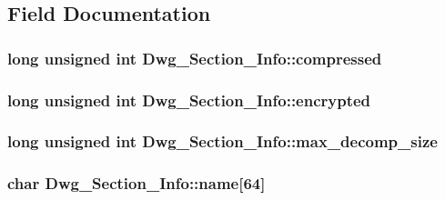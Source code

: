 \subsection{\-Field \-Documentation}
\hypertarget{structDwg__Section__Info_a982e0a42745bcae558af3ab3cfe9cf58}{
\subsubsection[{compressed}]{\setlength{\rightskip}{0pt plus 5cm}long unsigned int {\bf \-Dwg\-\_\-\-Section\-\_\-\-Info\-::compressed}}}\label{structDwg__Section__Info_a982e0a42745bcae558af3ab3cfe9cf58}
\hypertarget{structDwg__Section__Info_afd772338987a356893cf012bca6ed2c3}{
\subsubsection[{encrypted}]{\setlength{\rightskip}{0pt plus 5cm}long unsigned int {\bf \-Dwg\-\_\-\-Section\-\_\-\-Info\-::encrypted}}}\label{structDwg__Section__Info_afd772338987a356893cf012bca6ed2c3}
\hypertarget{structDwg__Section__Info_ac5c15e3970ac4e600abdbe9b48214b6d}{
\subsubsection[{max\-\_\-decomp\-\_\-size}]{\setlength{\rightskip}{0pt plus 5cm}long unsigned int {\bf \-Dwg\-\_\-\-Section\-\_\-\-Info\-::max\-\_\-decomp\-\_\-size}}}\label{structDwg__Section__Info_ac5c15e3970ac4e600abdbe9b48214b6d}
\hypertarget{structDwg__Section__Info_aea3f32d599a506f82b66254945f234a8}{
\subsubsection[{name}]{\setlength{\rightskip}{0pt plus 5cm}char {\bf \-Dwg\-\_\-\-Section\-\_\-\-Info\-::name}\mbox{[}64\mbox{]}}}\label{structDwg__Section__Info_aea3f32d599a506f82b66254945f234a8}
